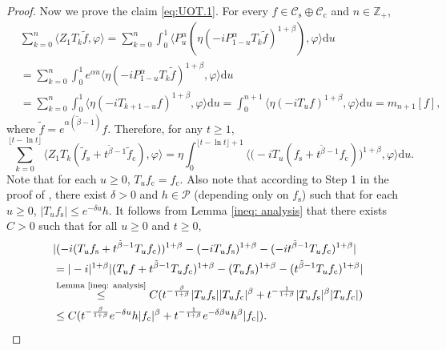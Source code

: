 \documentclass[12pt,a4paper]{amsart}
\theoremstyle{plain}
\theoremstyle{definition}
\numberwithin{equation}{section}
\begin{document}
\begin{proof}
Now we prove the claim \eqref{eq:UOT.1}.
For every $f\in \mathcal C_\mathrm s  \oplus \mathcal C_\mathrm c$ and $n\in \mathbb Z_+$,
 \begin{align}
  & \sum_{k=0}^n \langle Z_1 T_{k} \tilde f, \varphi \rangle
  = \sum_{k=0}^n \int_0^1 \langle P_u^\alpha (\eta(-iP_{1 - u}^\alpha T_k \tilde f)^{1+\beta}), \varphi\rangle \mathrm du
 \\& = \sum_{k=0}^n \int_0^1 e^{\alpha u} \langle \eta (-iP_{1 - u}^\alpha T_{k}\tilde f)^{1+\beta}, \varphi \rangle \mathrm du
 \\& = \sum_{k=0}^n \int_0^1 \langle \eta (-iT_{k+1 - u} f)^{1+\beta}, \varphi\rangle \mathrm du
 = \int_0^{n+1} \langle  \eta (-iT_{u} f)^{1+\beta}, \varphi\rangle \mathrm du = m_{n+1}[f],
 \end{align}
where $\tilde f=e^{\alpha(\tilde \beta - 1)} f$.
Therefore, for any $t\geq 1$,
\begin{equation} \label{eq:UOT.15}
\sum_{k=0}^{\lfloor t-\ln t \rfloor} \langle Z_1T_{k}(\tilde f_\mathrm s+t^{\tilde{\beta}-1}\tilde{f}_\mathrm c), \varphi\rangle
=\eta \int_0^{\lfloor t-\ln t \rfloor+1}\big\langle \big(-iT_u(f_\mathrm s+t^{\tilde{\beta}-1}f_\mathrm c)\big)^{1+\beta},\varphi \big\rangle \mathrm du.
\end{equation}
Note that for each $u\geq 0$, $T_uf_\mathrm c=f_\mathrm c$.
 Also note that according to
 Step 1 in the proof of \cite[Lemma 2.6]{RenSongSunZhao2019Stable}, there exist $\delta> 0$ and
$h\in \mathcal P$ (depending only on $f_\mathrm s$)
such that for each $u\geq 0$,
 $|T_u f_\mathrm s|\leq e^{-\delta u}h$.
It follows from Lemma \ref{ineq: analysis} that there exists $C>0$ such that for all $u\geq 0$ and $t\geq 0$,
\begin{align}
  &|(-i(T_uf_\mathrm s+t^{\tilde{\beta}-1}T_uf_\mathrm c))^{1+\beta}-(-iT_uf_\mathrm s)^{1+\beta}-(-it^{\tilde{\beta}-1}T_uf_\mathrm c)^{1+\beta}|
  \\&  = |-i|^{1+\beta} |(T_u f + t^{\tilde \beta -1} T_u f_\mathrm c)^{1+\beta} - (T_u f_\mathrm s)^{1+\beta} - (t^{\tilde \beta - 1}T_u f_\mathrm c)^{1+\beta}|
  \\&\overset{\text{Lemma \ref{ineq: analysis}}}
  \leq  C(t^{-\frac{\beta}{1+\beta}}|T_uf_\mathrm s||T_uf_\mathrm c|^{\beta}+t^{-\frac{1}{1+\beta}}|T_uf_\mathrm s|^{\beta}|T_uf_\mathrm c|)
  \\&\label{eq:UOT.21}\leq C(t^{-\frac{\beta}{1+\beta}}e^{-\delta u}h|f_\mathrm c|^{\beta}+t^{-\frac{1}{1+\beta}}e^{-\delta\beta u}h^{\beta}|f_\mathrm c|).
\end{align}

\end{proof}
\end{document}
